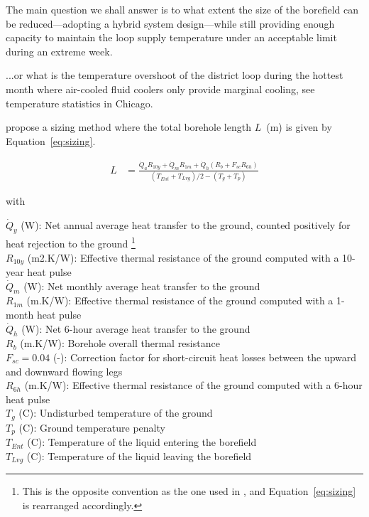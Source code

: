 The main question we shall answer is to what extent the size of the borefield can be reduced---adopting a hybrid system design---while still providing enough capacity to maintain the loop supply temperature under an acceptable limit during an extreme week.

...or what is the temperature overshoot of the district loop during the hottest month where air-cooled fluid coolers only provide marginal cooling, see temperature statistics in Chicago.

\cite{Kavanaugh2014} propose a sizing method where the total borehole length $L$~(m) is given by Equation~\ref{eq:sizing}.

\begin{align}
    \label{eq:sizing}
    L &= \frac{\dot{Q}_a R_{10y} + \dot{Q}_m R_{1m} + \dot{Q}_h \left( R_b + F_{sc} R_{6h} \right)}{\left( T_{Ent} + T_{Lvg} \right) / 2 - \left( T_g + T_p \right)}
\end{align}

with

\begin{avec}
    $\dot{Q}_y$ (W): Net annual average heat transfer to the ground, counted positively for heat rejection to the ground%
    \footnote{This is the opposite convention as the one used in \cite{Kavanaugh2014}, and Equation~\ref{eq:sizing} is rearranged accordingly.}\\
    $R_{10y}$ (m2.K/W): Effective thermal resistance of the ground computed with a 10-year heat pulse \\
    $\dot{Q}_m$ (W): Net monthly average heat transfer to the ground\\
    $R_{1m}$ (m.K/W): Effective thermal resistance of the ground computed with a 1-month heat pulse \\
    $\dot{Q}_h$ (W): Net 6-hour average heat transfer to the ground\\
    $R_b$ (m.K/W): Borehole overall thermal resistance \\
    $F_{sc} = 0.04$ (-): Correction factor for short-circuit heat losses between the upward and downward flowing legs\\
    $R_{6h}$ (m.K/W): Effective thermal resistance of the ground computed with a 6-hour heat pulse \\
    $T_g$ (C): Undisturbed temperature of the ground \\
    $T_p$ (C): Ground temperature penalty \\
    $T_{Ent}$ (C): Temperature of the liquid entering the borefield \\
    $T_{Lvg}$ (C): Temperature of the liquid leaving the borefield \\
\end{avec}

